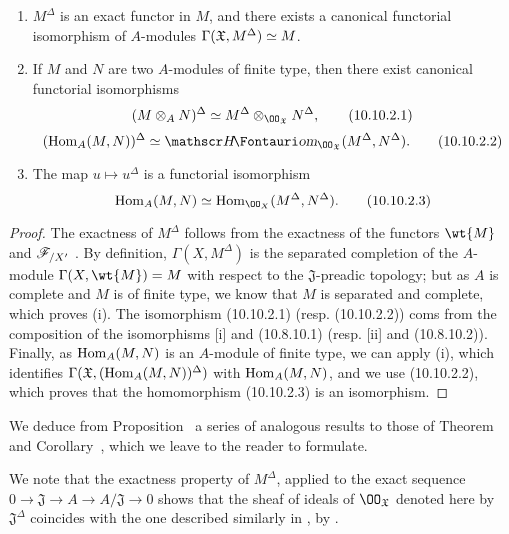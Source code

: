 \begin{prop}[10.10.2]
\label{1.10.10.2}
\medskip\noindent
\begin{enumerate}[label=\emph{(\roman*)}]
  \item $M^\Delta$ is an exact functor in $M$, and there exists a canonical functorial isomorphism of $A$-modules $\Gamma(\mathfrak{X},M^\Delta)\simeq M$.
  \item If $M$ and $N$ are two $A$-modules of finite type, then there exist canonical functorial isomorphisms
    \[
      (M\otimes_A N)^\Delta\isoto M^\Delta\otimes_{\OO_\mathfrak{X}}N^\Delta,
      \tag{10.10.2.1}
    \]
    \[
      (\Hom_A(M,N))^\Delta\isoto\shHom_{\OO_\mathfrak{X}}(M^\Delta,N^\Delta).
      \tag{10.10.2.2}
    \]
  \item The map $u\mapsto u^\Delta$ is a functorial isomorphism
    \[
      \Hom_A(M,N)\isoto\Hom_{\OO_X}(M^\Delta,N^\Delta).
      \tag{10.10.2.3}
    \]
\end{enumerate}
\end{prop}

\begin{proof}
\label{proof-1.10.10.2}
The exactness of $M^\Delta$ follows from the exactness of the functors $\wt{M}$  and $\mathscr{F}_{/X'}$ .
By definition, $\Gamma(X,M^\Delta)$ is the separated completion of the $A$-module $\Gamma(X,\wt{M})=M$ with respect to the $\mathfrak{J}$-preadic topology; but as $A$ is complete and $M$ is of finite type, we know  that $M$ is separated and complete, which proves (i).
The isomorphism (10.10.2.1) (resp. (10.10.2.2)) coms from the composition of the isomorphisms [i] and (10.8.10.1) (resp. [ii] and (10.8.10.2)).
Finally, as $\operatorname{Hom}_A(M,N)$ is an $A$-module of finite type, we can apply (i), which identifies $\Gamma(\mathfrak{X},(\operatorname{Hom}_A(M,N))^\Delta)$ with $\operatorname{Hom}_A(M,N)$, and we use (10.10.2.2), which proves that the homomorphism (10.10.2.3) is an isomorphism.
\end{proof}

We deduce from Proposition~ a series of analogous results to those of Theorem~ and Corollary~, which we leave to the reader to formulate.

We note that the exactness property of $M^\Delta$, applied to the exact sequence $0\to\mathfrak{J}\to A\to A/\mathfrak{J}\to 0$ shows that the sheaf of ideals of $\OO_\mathfrak{X}$ denoted here by $\mathfrak{J}^\Delta$ coincides with the one described similarly in , by .

